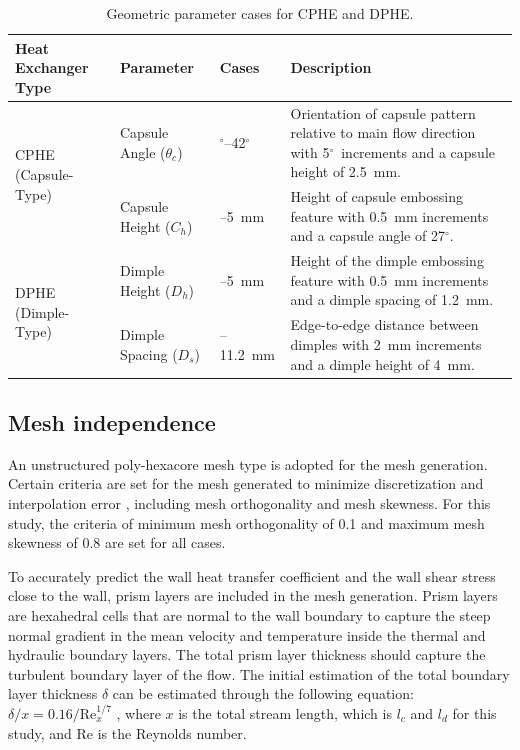 \documentclass[review,12pt]{elsarticle}
\newcommand{\degree}{\ensuremath{^\circ}}
\begin{document}
\begin{table}[H]
\centering
\caption{Geometric parameter cases for CPHE and DPHE.}
\label{tab:geom_cases}
\footnotesize
\renewcommand{\arraystretch}{1.2}
\begin{tabularx}{\textwidth}{ll>{\raggedright\arraybackslash}l>{\raggedright\arraybackslash}X}
\hline
\textbf{Heat Exchanger Type} & \textbf{Parameter} & \textbf{Cases} & \textbf{Description} \\ \hline
\multirow{2}{*}{CPHE (Capsule-Type)} 
& Capsule Angle ($\theta_c$) & 12\degree--42\degree & Orientation of capsule pattern relative to main flow direction with 5\degree\ increments and a capsule height of 2.5~mm. \\
& Capsule Height ($C_h$) & 2--5~mm & Height of capsule embossing feature with 0.5~mm increments and a capsule angle of 27\degree. \\ \hline
\multirow{2}{*}{DPHE (Dimple-Type)} 
& Dimple Height ($D_h$) & 2--5~mm & Height of the dimple embossing feature with 0.5~mm increments and a dimple spacing of 1.2~mm. \\
& Dimple Spacing ($D_s$) & 1.2--11.2~mm & Edge-to-edge distance between dimples with 2~mm increments and a dimple height of 4~mm. \\ \hline
\end{tabularx}
\end{table}

\subsection{Mesh independence}
\label{sec:mesh}

An unstructured poly-hexacore mesh type is adopted for the mesh generation. Certain criteria are set for the mesh generated to minimize discretization and interpolation error \citep{sorgente2023, juretic2010}, including mesh orthogonality and mesh skewness. For this study, the criteria of minimum mesh orthogonality of 0.1 and maximum mesh skewness of 0.8 are set for all cases.

To accurately predict the wall heat transfer coefficient and the wall shear stress close to the wall, prism layers are included in the mesh generation. Prism layers are hexahedral cells that are normal to the wall boundary to capture the steep normal gradient in the mean velocity and temperature inside the thermal and hydraulic boundary layers. The total prism layer thickness should capture the turbulent boundary layer of the flow. The initial estimation of the total boundary layer thickness $\delta$ can be estimated through the following equation: $\delta/x = 0.16/\text{Re}_x^{1/7}$ \citep{cengel2014}, where $x$ is the total stream length, which is $l_c$ and $l_d$ for this study, and Re is the Reynolds number.
\end{document}

